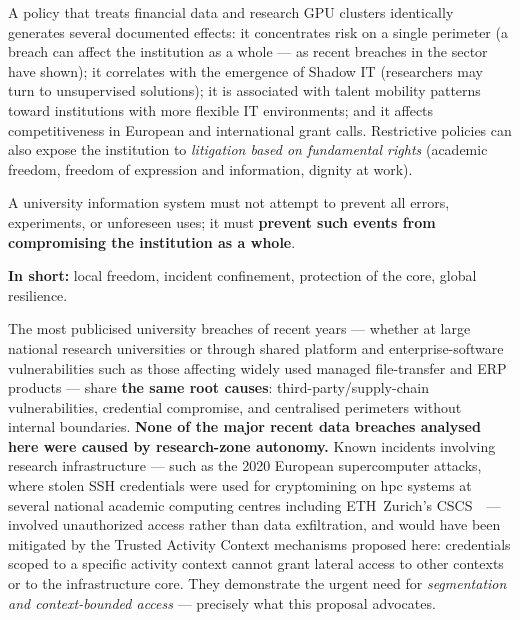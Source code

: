 A policy that treats financial data and research GPU clusters
identically generates several documented effects: it concentrates
risk on a single perimeter (a breach can affect the institution
as a whole --- as recent breaches in the sector
have shown); it correlates with the
emergence of Shadow IT (researchers may turn to unsupervised
solutions); it is associated with talent mobility patterns toward
institutions with more flexible IT environments; and it affects
competitiveness in European and international grant calls.
Restrictive policies can also expose the institution to
\emph{litigation based on fundamental rights} (academic freedom,
freedom of expression and information, dignity at work).

\begin{principlebox}
A university information system must not attempt to prevent all errors,
experiments, or unforeseen uses; it must \textbf{prevent such events from
compromising the institution as a whole}.

\smallskip
\textbf{In short:} local freedom, incident confinement, protection of the
core, global resilience.
\end{principlebox}

\begin{alertbox}
The most publicised university breaches of recent years --- whether at
large national research universities or through shared platform and
enterprise-software vulnerabilities such as those affecting widely used
managed file-transfer and ERP products --- share \textbf{the same root causes}:
third-party/supply-chain vulnerabilities, credential compromise, and
centralised perimeters without internal boundaries.
\textbf{None of the major recent data breaches analysed here were caused by research-zone
autonomy.} Known incidents involving research infrastructure --- such as
the 2020 European supercomputer attacks, where stolen SSH credentials
were used for cryptomining on \gls{hpc} systems at several national
academic computing centres including ETH~Zurich's CSCS~\cite{eu-supercomputers-2020}~--- involved unauthorized access rather than data exfiltration, and
would have been mitigated by the Trusted Activity Context mechanisms
proposed here: credentials scoped to a specific activity context cannot
grant lateral access to other contexts or to the infrastructure core.
They demonstrate the urgent need for \emph{segmentation and
context-bounded access} --- precisely what this proposal advocates.
\end{alertbox}

